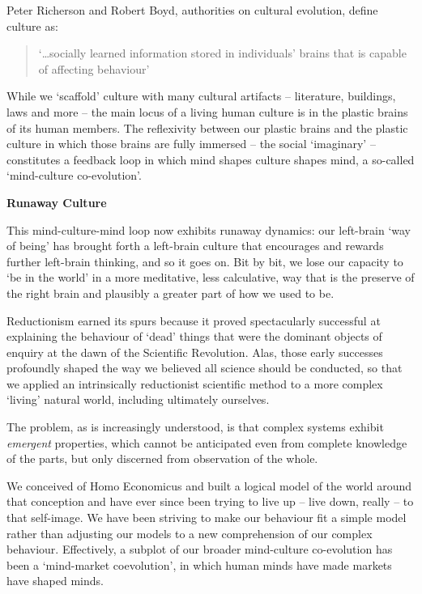 \documentclass[
]{book}
\begin{document}
Peter Richerson and Robert Boyd, authorities on cultural evolution, define culture as:

\begin{quote}
`\ldots socially learned information stored in individuals' brains that is capable of affecting behaviour'
\end{quote}

While we `scaffold' culture with many cultural artifacts -- literature, buildings, laws and more -- the main locus of a living human culture is in the plastic brains of its human members. The reflexivity between our plastic brains and the plastic culture in which those brains are fully immersed -- the social `imaginary' -- constitutes a feedback loop in which mind shapes culture shapes mind, a so-called `mind-culture co-evolution'.

\textbf{Runaway Culture}

This mind-culture-mind loop now exhibits runaway dynamics: our left-brain `way of being' has brought forth a left-brain culture that encourages and rewards further left-brain thinking, and so it goes on. Bit by bit, we lose our capacity to `be in the world' in a more meditative, less calculative, way that is the preserve of the right brain and plausibly a greater part of how we used to be.

Reductionism earned its spurs because it proved spectacularly successful at explaining the behaviour of `dead' things that were the dominant objects of enquiry at the dawn of the Scientific Revolution. Alas, those early successes profoundly shaped the way we believed all science should be conducted, so that we applied an intrinsically reductionist scientific method to a more complex `living' natural world, including ultimately ourselves.

The problem, as is increasingly understood, is that complex systems exhibit \emph{emergent} properties, which cannot be anticipated even from complete knowledge of the parts, but only discerned from observation of the whole.

We conceived of Homo Economicus and built a logical model of the world around that conception and have ever since been trying to live up -- live down, really -- to that self-image. We have been striving to make our behaviour fit a simple model rather than adjusting our models to a new comprehension of our complex behaviour. Effectively, a subplot of our broader mind-culture co-evolution has been a `mind-market coevolution', in which human minds have made markets have shaped minds.
\end{document}
